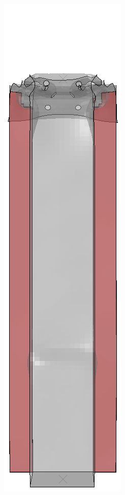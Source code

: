 \documentclass[
documentsize = a4, %
font = cmr, %
typesize = 11, %
printmode = true,
onehalfspacing = true,
language = en, %
titlepage = udciccp, %
degree = pt, %
dedication = true,
acknowledgements = true,
abstract-en = true,
abstract-es = false,
abstract-ga = false,
epigraphs = true,
toc = true,
lof = true,
lot = true,
frontmatterintoc = false,
notation = false,
minimal = false,
]{UDCthesis}
\begin{document}
\begin{figure}
\begin{minipage}[b]{.06\linewidth}
	\end{minipage}
	\quad
	\begin{minipage}[b]{.06\linewidth}
		\centering
		\includegraphics[width=\linewidth]{IMG_CUTRES/a3}

\end{minipage}
\end{figure}
\end{document}
